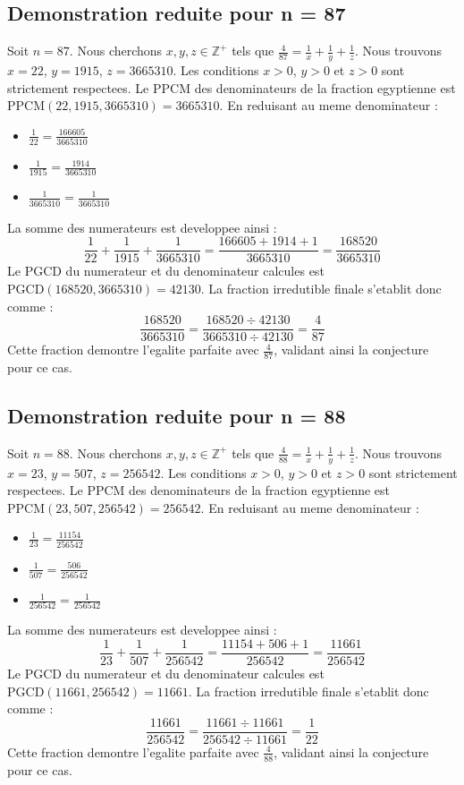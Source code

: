 \documentclass[11pt,a4paper]{article}
\begin{document}
\subsection{Demonstration reduite pour n = 87}
Soit $n = 87$. Nous cherchons $x, y, z \in \mathbb{Z}^{+}$ tels que $\frac{4}{87} = \frac{1}{x} + \frac{1}{y} + \frac{1}{z}$.
Nous trouvons $x = 22$, $y = 1915$, $z = 3665310$.
Les conditions $x > 0$, $y > 0$ et $z > 0$ sont strictement respectees.
Le PPCM des denominateurs de la fraction egyptienne est $\text{PPCM}(22, 1915, 3665310) = 3665310$.
En reduisant au meme denominateur :
\begin{itemize}
    \item $\frac{1}{22} = \frac{166605}{3665310}$
    \item $\frac{1}{1915} = \frac{1914}{3665310}$
    \item $\frac{1}{3665310} = \frac{1}{3665310}$
\end{itemize}
La somme des numerateurs est developpee ainsi :
$$ \frac{1}{22} + \frac{1}{1915} + \frac{1}{3665310} = \frac{166605 + 1914 + 1}{3665310} = \frac{168520}{3665310} $$
Le PGCD du numerateur et du denominateur calcules est $\text{PGCD}(168520, 3665310) = 42130$.
La fraction irredutible finale s'etablit donc comme :
$$ \frac{168520}{3665310} = \frac{168520 \div 42130}{3665310 \div 42130} = \frac{4}{87} $$
Cette fraction demontre l'egalite parfaite avec $\frac{4}{87}$, validant ainsi la conjecture pour ce cas.

\subsection{Demonstration reduite pour n = 88}
Soit $n = 88$. Nous cherchons $x, y, z \in \mathbb{Z}^{+}$ tels que $\frac{4}{88} = \frac{1}{x} + \frac{1}{y} + \frac{1}{z}$.
Nous trouvons $x = 23$, $y = 507$, $z = 256542$.
Les conditions $x > 0$, $y > 0$ et $z > 0$ sont strictement respectees.
Le PPCM des denominateurs de la fraction egyptienne est $\text{PPCM}(23, 507, 256542) = 256542$.
En reduisant au meme denominateur :
\begin{itemize}
    \item $\frac{1}{23} = \frac{11154}{256542}$
    \item $\frac{1}{507} = \frac{506}{256542}$
    \item $\frac{1}{256542} = \frac{1}{256542}$
\end{itemize}
La somme des numerateurs est developpee ainsi :
$$ \frac{1}{23} + \frac{1}{507} + \frac{1}{256542} = \frac{11154 + 506 + 1}{256542} = \frac{11661}{256542} $$
Le PGCD du numerateur et du denominateur calcules est $\text{PGCD}(11661, 256542) = 11661$.
La fraction irredutible finale s'etablit donc comme :
$$ \frac{11661}{256542} = \frac{11661 \div 11661}{256542 \div 11661} = \frac{1}{22} $$
Cette fraction demontre l'egalite parfaite avec $\frac{4}{88}$, validant ainsi la conjecture pour ce cas.
\end{document}
